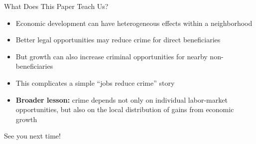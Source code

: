 \documentclass[11pt,notes=hide,aspectratio=169,mathserif]{beamer}
\begin{document}
\begin{frame}{What Does This Paper Teach Us?}
\begin{itemize}
\item Economic development can have heterogeneous effects within a neighborhood
\pause \item Better legal opportunities may reduce crime for direct beneficiaries
\pause \item But growth can also increase criminal opportunities for nearby non-beneficiaries
\pause \item This complicates a simple ``jobs reduce crime'' story
\pause \item \textbf{Broader lesson:} crime depends not only on individual labor-market opportunities, but also on the local distribution of gains from economic growth
\end{itemize}
\end{frame}


\begin{frame}
\begin{center}{\LARGE See you next time!}\end{center}
\end{frame}


\end{document}
